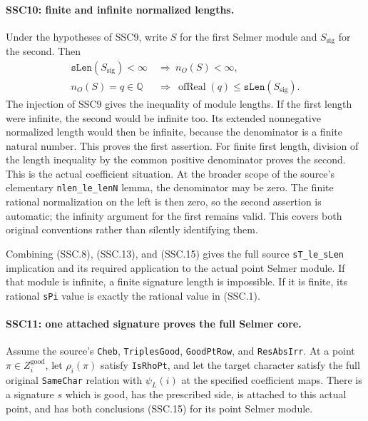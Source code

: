 \paragraph{SSC10: finite and infinite normalized lengths.}
\label{claim:SSC10}
Under the hypotheses of SSC9, write $S$ for the first Selmer module
and $S_{\mathrm{sig}}$ for the second. Then
\[
 \begin{split}
 \texttt{sLen}(S_{\mathrm{sig}})<\infty
      &\ \Longrightarrow\ n_O(S)<\infty,\\
 n_O(S)=q\in\mathbb Q
      &\ \Longrightarrow\ \operatorname{ofReal}(q)
                    \le\texttt{sLen}(S_{\mathrm{sig}}).
 \end{split}                                                   \tag{SSC.15}
\]
The injection of SSC9 gives the inequality of module lengths. If
the first length were infinite, the second would be infinite too.
Its extended nonnegative normalized length would then be infinite,
because the denominator is a finite natural number. This proves
the first assertion. For finite first length, division of the
length inequality by the common positive denominator proves the
second. This is the actual coefficient situation. At the broader
scope of the source's elementary \texttt{nlen\_le\_lenN} lemma,
the denominator may be zero. The finite rational normalization
on the left is then zero, so the second assertion is automatic;
the infinity argument for the first remains valid. This covers
both original conventions rather than silently identifying them.

Combining (SSC.8), (SSC.13), and (SSC.15) gives the full source
\texttt{sT\_le\_sLen} implication and its required application to
the actual point Selmer module. If that module is infinite, a finite
signature length is impossible. If it is finite, its rational
\texttt{sPi} value is exactly the rational value in (SSC.1).

\paragraph{SSC11: one attached signature proves the full Selmer core.}
\label{claim:SSC11}
Assume the source's \texttt{Cheb}, \texttt{TriplesGood},
\texttt{GoodPtRow}, and \texttt{ResAbsIrr}. At a point
$\pi\in Z_i^{\mathrm{good}}$, let $\rho_i(\pi)$ satisfy
\texttt{IsRhoPt}, and let the target character satisfy the full
original \texttt{SameChar} relation with $\psi_L(i)$ at the
specified coefficient maps. There is a signature $s$ which is
good, has the prescribed side, is attached to this actual point,
and has both conclusions (SSC.15) for its point Selmer module.

